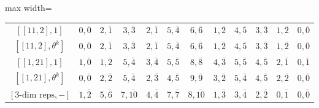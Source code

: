 \begin{table}[ht]
\begin{adjustbox}{max width=\linewidth}
\begin{tabular}{|c|ccccccccccc|}
        $[[11,2],1]$ & $0,\bar{0}$ & $2,\bar{1}$ & $3,\bar{3}$ & $2,\bar{1}$ & $5,\bar{4}$ & $6,\bar{6}$ & $1,\bar{2}$ & $4,\bar{5}$ & $3,\bar{3}$ & $1,\bar{2}$ & $0,\bar{0}$ \\
        $[[11,2],\theta^k]$ & $0,\bar{0}$ & $2,\bar{1}$ & $3,\bar{3}$ & $2,\bar{1}$ & $5,\bar{4}$ & $6,\bar{6}$ & $1,\bar{2}$ & $4,\bar{5}$ & $3,\bar{3}$ & $1,\bar{2}$ & $0,\bar{0}$ \\    
        
        $[[1,21],1]$ & $1,\bar{0}$ & $1,\bar{2}$ & $5,\bar{4}$ & $3,\bar{4}$ & $5,\bar{5}$ & $8,\bar{8}$ & $4,\bar{3}$ & $5,\bar{5}$ & $4,\bar{5}$ & $2,\bar{1}$ & $0,\bar{1}$ \\ 
        $[[1,21],\theta^k]$ & $0,\bar{0}$ & $2,\bar{2}$ & $5,\bar{4}$ & $2,\bar{3}$ & $4,\bar{5}$ & $9,\bar{9}$ & $3,\bar{2}$ & $5,\bar{4}$ & $4,\bar{5}$ & $2,\bar{2}$ & $0,\bar{0}$ \\

        $[3\text{-dim reps},-]$ & $1,\bar{2}$ & $5,\bar{6}$ & $7,\bar{10}$ & $4,\bar{4}$ & $7,\bar{7}$ & $8,\bar{10}$ & $1,\bar{3}$ & $3,\bar{4}$ & $2,\bar{2}$ & $0,\bar{1}$ & $0,\bar{0}$ \\

        \hline

        \end{tabular}
    \end{adjustbox}
    \end{table}


